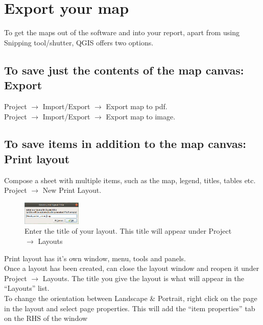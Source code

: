 
\chapter{Export your map}

\pagestyle{fancy}
\fancyhf{}
\fancyhead[OC]{\leftmark}
\fancyhead[EC]{\rightmark}
\cfoot{\thepage}


To get the maps out of the software and into your report, apart from using Snipping tool/shutter, QGIS offers two options.

\section{To save just the contents of the map canvas: Export}
Project $\rightarrow$ Import/Export $\rightarrow$ Export map to pdf.\\
Project $\rightarrow$ Import/Export $\rightarrow$ Export map to image.

\section{To save items in addition to the map canvas: Print layout}
Compose a sheet with multiple items, such as the map, legend, titles, tables etc.\\

Project $\rightarrow$ New Print Layout.


\begin{figure}[!h]
	\centering
	\includegraphics[width=0.25\textwidth]{images/create_print_layout_name.png}
	\caption{Enter the title of your layout. This title will appear under Project $\rightarrow$ Layouts}
	\label{ft_fig_firstfig3}
\end{figure}

Print layout has it's own window, menu, tools and panels.\\
Once a layout has been created, can close the layout window and reopen it under Project $\rightarrow$ Layouts. The title you give the layout is what will appear in the “Layouts” list.\\

To change the orientation between Landscape \& Portrait, right click on the page in the layout and select page properties. This will add the “item properties” tab on the RHS of the window


